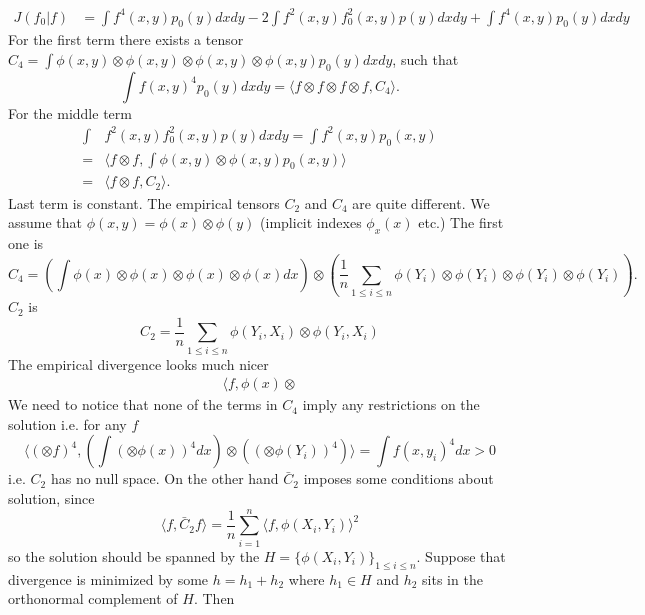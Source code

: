 \documentclass[10pt]{article}
\begin{document}
\begin{align}
 J(f_0|f) &= \int f^4(x,y) p_0(y) dx dy - 2 \int f^2(x,y) f_0^2(x,y) p(y) dx dy + \int f^4(x,y) p_0(y) dx dy 
\end{align}
For the first term there exists a tensor $C_4 = \int \phi(x,y) \otimes \phi(x,y) \otimes \phi(x,y) \otimes \phi(x,y) p_0(y) dx dy$, such that 
\begin{equation}
 \int f(x,y)^4 p_0(y) dx dy = \langle f \otimes f \otimes f \otimes f , C_4 \rangle.
\end{equation}
For the middle term 
\begin{align}
\int &f^2(x,y) f_0^2(x,y) p(y) dx dy = \int f^2(x,y) p_0(x,y) \\
 =&  \langle f \otimes f  , \int \phi(x,y) \otimes \phi(x,y) p_0(x,y) \rangle \\
 =& \langle f \otimes f  , C_2 \rangle.
\end{align}
Last term is constant. The empirical tensors $C_2$ and $C_4$ are quite different. We assume that $\phi(x,y) = \phi(x) \otimes \phi(y)$ (implicit indexes $ \phi_x(x)$ etc.) The first one is 
\begin{equation}
 C_4 = \left( \int \phi(x) \otimes \phi(x) \otimes \phi(x) \otimes \phi(x) dx  \right)  \otimes \left( \frac 1 n\sum_{1 \leq i \leq n}  \phi(Y_{i}) \otimes \phi(Y_{i}) \otimes \phi(Y_{i}) \otimes \phi(Y_{i}) \right). 
\end{equation}
$C_2$ is
\begin{equation}
 C_2 = \frac 1 n \sum_{1 \leq i \leq n } \phi(Y_{i},X_{i}) \otimes \phi(Y_{i},X_{i}) 
\end{equation}
The empirical divergence looks much nicer
\begin{align}
 \langle f, \phi(x) \otimes
\end{align}
We need to notice that none of the terms in $C_4$ imply any restrictions on the solution i.e. for any $f$  
\begin{equation}
 \langle  (\otimes f)^4  ,  \left( \int  (\otimes \phi(x))^4 dx  \right)  \otimes \left(    (\otimes \phi(Y_{i}))^4 \right) \rangle = \int f(x,y_i)^4 dx > 0
\end{equation}
i.e. $C_2$ has no null space. On the other hand $\bar C_2$ imposes some conditions about solution, since 
\begin{equation}
 \langle f, \bar C_2 f \rangle = \frac 1 n \sum_{i=1}^n \langle f , \phi(X_i,Y_i) \rangle^2   
\end{equation}
so the solution should be spanned by the $H = \{ \phi(X_i,Y_i) \}_{1 \leq i \leq n}$. Suppose that divergence is minimized by some $h = h_1 + h_2$ where $h_1 \in H$ and $h_2$ sits in the orthonormal complement of $H$. Then 
\end{document}
